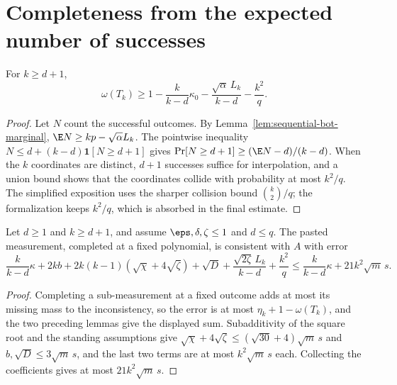 \section{Completeness from the expected number of successes}

\begin{lemma}[Completeness]\label{lem:first-success-completeness}
	\leanok
	For $k\ge d+1$,
	\[
		\omega(T_k)\ge1-\frac{k}{k-d}\kappa_0-\frac{\sqrt\alpha\,L_k}{k-d}
		-\frac{k^2}q.
	\]
\end{lemma}
\begin{proof}
	\leanok
	Let $N$ count the successful outcomes.  By
	Lemma~\ref{lem:sequential-bot-marginal}, $\E N\ge kp-\sqrt\alpha L_k$.
	The pointwise inequality $N\le d+(k-d)\mathbf 1[N\ge d+1]$ gives
	$\Pr[N\ge d+1]\ge(\E N-d)/(k-d)$.  When the $k$ coordinates are distinct,
	$d+1$ successes suffice for interpolation, and a union bound shows that
	the coordinates collide with probability at most $k^2/q$.  The
	simplified exposition uses the sharper collision bound
	$\binom k2/q$; the formalization keeps $k^2/q$, which is absorbed in the
	final estimate.
\end{proof}

\begin{lemma}\label{lem:pasting-explicit-error}
	\leanok
	Let $d\ge1$ and $k\ge d+1$, and assume $\eps,\delta,\zeta\le1$ and
	$d\le q$.  The pasted measurement, completed at a fixed polynomial, is
	consistent with $A$ with error
	\[
		\frac{k}{k-d}\kappa+2kb+2k(k-1)(\sqrt\chi+4\sqrt\zeta)+\sqrt D
		+\frac{\sqrt{2\zeta}\,L_k}{k-d}+\frac{k^2}q
		\le\frac{k}{k-d}\kappa+21k^2\sqrt m\,s.
	\]
\end{lemma}
\begin{proof}
	\leanok
	Completing a sub-measurement at a fixed outcome adds at most its missing
	mass to the inconsistency, so the error is at most
	$\eta_k+1-\omega(T_k)$, and the two preceding lemmas give the displayed
	sum.  Subadditivity of the square root and the standing assumptions give
	$\sqrt\chi+4\sqrt\zeta\le(\sqrt{30}+4)\sqrt m\,s$ and
	$b,\sqrt D\le3\sqrt m\,s$, and the last two terms are at most
	$k^2\sqrt m\,s$ each.  Collecting the coefficients gives at most
	$21k^2\sqrt m\,s$.
\end{proof}

